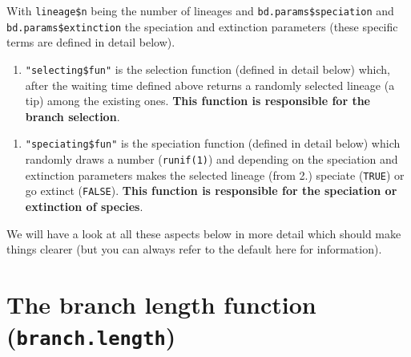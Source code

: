 \documentclass[
]{book}
\newenvironment{Shaded}{\begin{snugshade}}{\end{snugshade}}
\newcommand{\DecValTok}[1]{\textcolor[rgb]{0.00,0.00,0.81}{#1}}
\newcommand{\KeywordTok}[1]{\textcolor[rgb]{0.13,0.29,0.53}{\textbf{#1}}}
\newcommand{\NormalTok}[1]{#1}
\newcommand{\OperatorTok}[1]{\textcolor[rgb]{0.81,0.36,0.00}{\textbf{#1}}}
\newcommand{\StringTok}[1]{\textcolor[rgb]{0.31,0.60,0.02}{#1}}
\providecommand{\tightlist}{%
  \setlength{\itemsep}{0pt}\setlength{\parskip}{0pt}}
\begin{document}
With \texttt{lineage\$n} being the number of lineages and \texttt{bd.params\$speciation} and \texttt{bd.params\$extinction} the speciation and extinction parameters (these specific terms are defined in detail below).

\begin{enumerate}
\def\labelenumi{\arabic{enumi}.}
\setcounter{enumi}{1}
\tightlist
\item
  \texttt{"selecting\$fun"} is the selection function (defined in detail below) which, after the waiting time defined above returns a randomly selected lineage (a tip) among the existing ones. \textbf{This function is responsible for the branch selection}.
\end{enumerate}

\begin{Shaded}
\end{Shaded}

\begin{enumerate}
\def\labelenumi{\arabic{enumi}.}
\setcounter{enumi}{2}
\tightlist
\item
  \texttt{"speciating\$fun"} is the speciation function (defined in detail below) which randomly draws a number (\texttt{runif(1)}) and depending on the speciation and extinction parameters makes the selected lineage (from 2.) speciate (\texttt{TRUE}) or go extinct (\texttt{FALSE}). \textbf{This function is responsible for the speciation or extinction of species}.
\end{enumerate}

\begin{Shaded}
\end{Shaded}

We will have a look at all these aspects below in more detail which should make things clearer (but you can always refer to the default here for information).

\hypertarget{the-branch-length-function-branch.length}{%
\section{\texorpdfstring{The branch length function (\texttt{branch.length})}{The branch length function (branch.length)}}\label{the-branch-length-function-branch.length}}
\end{document}
